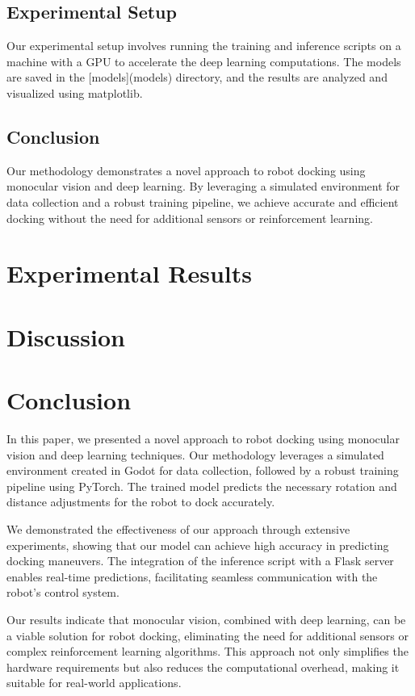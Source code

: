 \documentclass{article}
\begin{document}
\subsection{Experimental Setup}
Our experimental setup involves running the training and inference scripts on a machine with a GPU to accelerate the deep learning computations. The models are saved in the [models](models) directory, and the results are analyzed and visualized using matplotlib.

\subsection{Conclusion}
Our methodology demonstrates a novel approach to robot docking using monocular vision and deep learning. By leveraging a simulated environment for data collection and a robust training pipeline, we achieve accurate and efficient docking without the need for additional sensors or reinforcement learning.

\section{Experimental Results}

\section{Discussion}

\section{Conclusion}
In this paper, we presented a novel approach to robot docking using monocular vision and deep learning techniques. Our methodology leverages a simulated environment created in Godot for data collection, followed by a robust training pipeline using PyTorch. The trained model predicts the necessary rotation and distance adjustments for the robot to dock accurately.

We demonstrated the effectiveness of our approach through extensive experiments, showing that our model can achieve high accuracy in predicting docking maneuvers. The integration of the inference script with a Flask server enables real-time predictions, facilitating seamless communication with the robot's control system.

Our results indicate that monocular vision, combined with deep learning, can be a viable solution for robot docking, eliminating the need for additional sensors or complex reinforcement learning algorithms. This approach not only simplifies the hardware requirements but also reduces the computational overhead, making it suitable for real-world applications.
\end{document}
